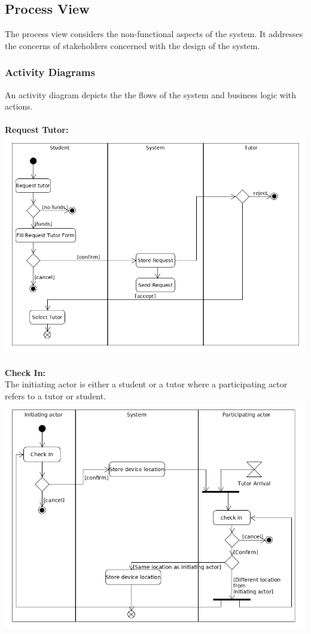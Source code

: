 \documentclass[12pt]{article}
\begin{document}
\newpage

\subsection{Process View}
The process view considers the non-functional aspects of the system. It addresses the concerns of stakeholders concerned
with the design of the system.

\subsubsection{Activity Diagrams}
An activity diagram depicts the the flows of the system and business logic with actions.\\
\\\textbf{Request Tutor:}\\
\includegraphics[width=140mm]{./activity_diagram/request_tutor.png}
\\\\\textbf{Check In:}\\
The initiating actor is either a student or a tutor where a participating actor refers to a tutor or student.\\
\includegraphics[width=140mm]{./activity_diagram/checked_in.png}
\end{document}
